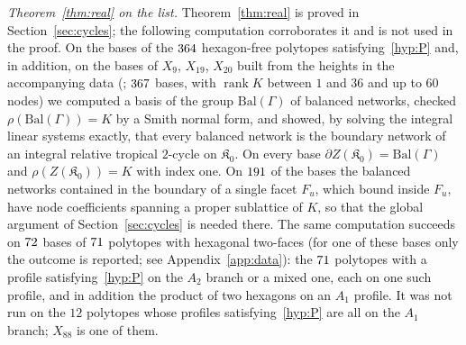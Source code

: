 \emph{Theorem~\ref{thm:real} on the list.} Theorem~\ref{thm:real} is proved in Section~\ref{sec:cycles}; the following
computation corroborates it and is not used in the proof. On the bases of the $364$ hexagon-free polytopes satisfying~\ref{hyp:P}
and, in addition, on the bases of $X_9$, $X_{19}$, $X_{20}$ built from the heights in the accompanying data
(\coderepo; $367$ bases, with $\operatorname{rank}K$ between $1$ and $36$ and up to $60$ nodes) we computed a
basis of the group $\mathrm{Bal}(\Gamma)$ of balanced networks, checked $\rho(\mathrm{Bal}(\Gamma))=K$ by a Smith normal
form, and showed, by solving the integral linear systems exactly, that every balanced network is the boundary network
of an integral relative tropical $2$-cycle on $\mathfrak K_0$. On every base $\partial Z(\mathfrak K_0)=\mathrm{Bal}(\Gamma)$
and $\rho(Z(\mathfrak K_0))=K$ with index one. On $191$ of the
bases the balanced networks contained in the boundary of a single facet $F_u$, which bound inside $F_u$, have node
coefficients spanning a proper sublattice of $K$, so that the global argument of Section~\ref{sec:cycles} is needed
there. The same computation succeeds on $72$ bases
of $71$ polytopes with hexagonal two-faces (for one of these bases only the outcome is reported; see
Appendix~\ref{app:data}): the $71$ polytopes with a profile satisfying~\ref{hyp:P}
on the $A_2$ branch or a mixed one, each on one such profile, and in addition the product of two hexagons on an $A_1$
profile. It was not run on the $12$ polytopes whose profiles satisfying~\ref{hyp:P} are all on the $A_1$ branch; $X_{88}$ is
one of them.

